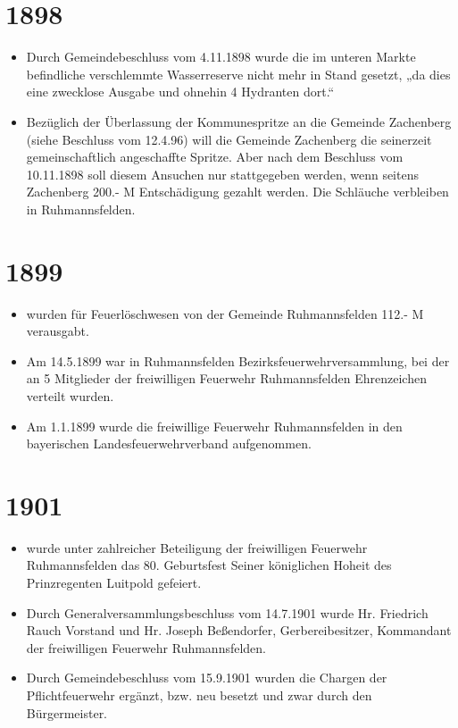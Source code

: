 \documentclass[12pt,a4paper]{book}
\begin{document}
\section*{1898}

\begin{itemize}
\item Durch Gemeindebeschluss vom 4.11.1898 wurde die im unteren Markte
befindliche verschlemmte Wasserreserve nicht mehr in Stand gesetzt, „da
dies eine zwecklose Ausgabe und ohnehin 4 Hydranten dort.“

\item Bezüglich der Überlassung der Kommunespritze an die Gemeinde
Zachenberg (siehe Beschluss vom 12.4.96) will die Gemeinde Zachenberg
die seinerzeit gemeinschaftlich angeschaffte Spritze. Aber nach dem
Beschluss vom 10.11.1898 soll diesem Ansuchen nur stattgegeben werden,
wenn seitens Zachenberg 200.- M Entschädigung gezahlt werden. Die
Schläuche verbleiben in Ruhmannsfelden.
\end{itemize}

\section*{1899}

\begin{itemize}
\item wurden für Feuerlöschwesen von der Gemeinde Ruhmannsfelden 112.- M
verausgabt.

\item Am 14.5.1899 war in Ruhmannsfelden Bezirksfeuerwehrversammlung,
bei der an 5 Mitglieder der freiwilligen Feuerwehr Ruhmannsfelden
Ehrenzeichen verteilt wurden.

\item Am 1.1.1899 wurde die freiwillige Feuerwehr Ruhmannsfelden in den
bayerischen Landesfeuerwehrverband aufgenommen.
\end{itemize}

\section*{1901}

\begin{itemize}
\item wurde unter zahlreicher Beteiligung der freiwilligen Feuerwehr
Ruhmannsfelden das 80. Geburtsfest Seiner königlichen Hoheit des
Prinzregenten Luitpold gefeiert.

\item Durch Generalversammlungsbeschluss vom 14.7.1901 wurde Hr.
Friedrich Rauch Vorstand und Hr. Joseph Beßendorfer, Gerbereibesitzer,
Kommandant der freiwilligen Feuerwehr Ruhmannsfelden.

\item Durch Gemeindebeschluss vom 15.9.1901 wurden die Chargen der
Pflichtfeuerwehr ergänzt, bzw. neu besetzt und zwar durch den
Bürgermeister.
\end{itemize}
\end{document}
